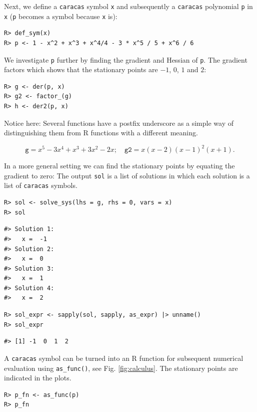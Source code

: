 Next, we define a \texttt{caracas} symbol \texttt{x} and
subsequently a \texttt{caracas} polynomial \texttt{p} in \texttt{x} (\texttt{p} becomes a symbol because \texttt{x} is):

\begin{verbatim}
R> def_sym(x)  
R> p <- 1 - x^2 + x^3 + x^4/4 - 3 * x^5 / 5 + x^6 / 6
\end{verbatim}

We investigate \texttt{p} further by finding the gradient and Hessian of \texttt{p}. The gradient factors which shows that the stationary
points are \(-1\), \(0\), \(1\) and \(2\):

\begin{verbatim}
R> g <- der(p, x) 
R> g2 <- factor_(g)
R> h <- der2(p, x)
\end{verbatim}

Notice here: Several functions have a postfix underscore as a simple
way of distinguishing them from R functions with a different
meaning.

\[
 \texttt{g}  = x^{5} - 3 x^{4} + x^{3} + 3 x^{2} - 2 x; \quad 
 \texttt{g2}  = x \left(x - 2\right) \left(x - 1\right)^{2} \left(x + 1\right).
\]

In a more general setting we can find the stationary points by equating the gradient to zero:
The output \texttt{sol} is a list of solutions in which each solution is a list of \texttt{caracas} symbols.

\begin{verbatim}
R> sol <- solve_sys(lhs = g, rhs = 0, vars = x)
R> sol
\end{verbatim}

\begin{verbatim}
#> Solution 1:
#>   x =  -1 
#> Solution 2:
#>   x =  0 
#> Solution 3:
#>   x =  1 
#> Solution 4:
#>   x =  2
\end{verbatim}

\begin{verbatim}
R> sol_expr <- sapply(sol, sapply, as_expr) |> unname()
R> sol_expr
\end{verbatim}

\begin{verbatim}
#> [1] -1  0  1  2
\end{verbatim}

A \texttt{caracas} symbol can be turned into an R function for subsequent
numerical evaluation using \texttt{as\_func()}, see
Fig. \ref{fig:calculus}.
The stationary points are indicated in the plots.

\begin{verbatim}
R> p_fn <- as_func(p)
R> p_fn
\end{verbatim}

